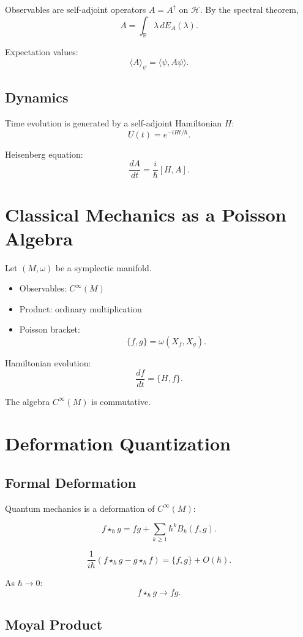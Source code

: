 \documentclass[11pt,a4paper]{article}
\begin{document}
Observables are self-adjoint operators $A=A^\dagger$ on $\mathcal H$. By the spectral theorem,
\[
A = \int_{\mathbb R} \lambda \, dE_A(\lambda).
\]

Expectation values:
\[
\langle A \rangle_\psi = \langle \psi, A\psi \rangle.
\]

\subsection{Dynamics}

Time evolution is generated by a self-adjoint Hamiltonian $H$:
\[
U(t) = e^{-iHt/\hbar}.
\]

Heisenberg equation:
\[
\frac{dA}{dt} = \frac{i}{\hbar}[H,A].
\]

\section{Classical Mechanics as a Poisson Algebra}

Let $(M,\omega)$ be a symplectic manifold.

\begin{itemize}
\item Observables: $C^\infty(M)$
\item Product: ordinary multiplication
\item Poisson bracket:
\[
\{f,g\} = \omega(X_f,X_g).
\]
\end{itemize}

Hamiltonian evolution:
\[
\frac{df}{dt} = \{H,f\}.
\]

The algebra $C^\infty(M)$ is commutative.

\section{Deformation Quantization}

\subsection{Formal Deformation}

Quantum mechanics is a deformation of $C^\infty(M)$:

\[
f \star_\hbar g
=
fg + \sum_{k\ge1}\hbar^k B_k(f,g).
\]

\[
\frac{1}{i\hbar}(f\star_\hbar g - g\star_\hbar f)
=
\{f,g\} + O(\hbar).
\]

As $\hbar \to 0$:
\[
f \star_\hbar g \to fg.
\]

\subsection{Moyal Product}
\end{document}
